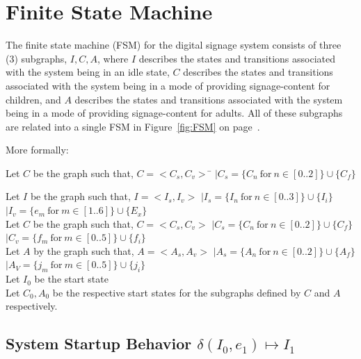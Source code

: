 \documentclass[10pt]{article}
\begin{document}
\section{Finite State Machine}

The finite state machine (FSM) for the digital signage system consists of three (3) subgraphs, $I, C, A$, where $I$ describes the states and transitions associated with the system being in an idle state, $C$ describes the states and transitions associated with the system being in a mode of providing signage-content for children, and $A$ describes the states and transitions associated with the system being in a mode of providing signage-content for adults. All of these subgraphs are related into a single FSM in Figure~\ref{fig:FSM} on page~\pageref{fig:FSM}.

More formally: 

\begin{tabbing}
	Let $C$ be the graph such that, $C = <C_{s}, C_{v}>$ \= $| C_{s} = \{C_{n}\ \textrm{for}\ n \in [0 .. 2]\} \cup \{C_{f}\}$ \kill 
	
	Let $I$ be the graph such that, $I = <I_{s}, I_{v}>$ \> $| I_{s} = \{I_{n}\ \textrm{for}\ n \in [0 .. 3]\} \cup \{I_{i}\}$ \\[0.5ex]
																		\> $| I_{v} = \{e_{m}\ \textrm{for}\ m \in [1 .. 6]\} \cup \{E_{x}\}$ \\[1em]
																		
	Let $C$ be the graph such that, $C = <C_{s}, C_{v}>$ \> $| C_{s} = \{C_{n}\ \textrm{for}\ n \in [0 .. 2]\} \cup \{C_{f}\}$ \\[0.5em]
																		\> $| C_{v} = \{f_{m}\ \textrm{for}\ m \in [0 .. 5]\} \cup \{f_{i}\}$ \\[1em]
																		
	Let $A$ by the graph such that, $A = <A_{s}, A_{v}>$ \> $| A_{s} = \{A_{n}\ \textrm{for}\ n \in [0 .. 2]\} \cup \{A_{f}\}$ \\[0.5ex]
																		\> $| A_{V} = \{j_{m}\ \textrm{for}\ m \in [0 .. 5]\} \cup \{j_{i}\}$\\[1em]
																		
	Let $I_{0}$ be the start state \\[1em]
	
	Let $C_{0}, A_{0}$ be the respective start states for the subgraphs defined by $C$ and $A$ respectively.
\end{tabbing}

\subsection{System Startup Behavior $\delta(I_{0}, e_{1}) \mapsto I_{1}$}
\end{document}
